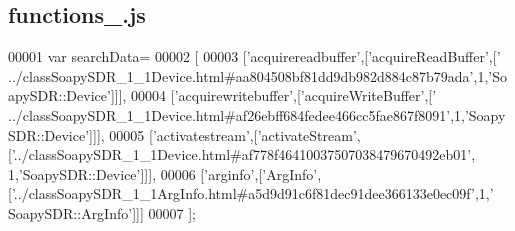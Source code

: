 \subsection{functions\+\_.\+js}
\label{functions__0_8js_source}

\begin{DoxyCode}
00001 var searchData=
00002 [
00003   [\textcolor{stringliteral}{'acquirereadbuffer'},[\textcolor{stringliteral}{'acquireReadBuffer'},[\textcolor{stringliteral}{'
      ../classSoapySDR\_1\_1Device.html#aa804508bf81dd9db982d884c87b79ada'},1,\textcolor{stringliteral}{'SoapySDR::Device'}]]],
00004   [\textcolor{stringliteral}{'acquirewritebuffer'},[\textcolor{stringliteral}{'acquireWriteBuffer'},[\textcolor{stringliteral}{'
      ../classSoapySDR\_1\_1Device.html#af26ebff684fedee466cc5fae867f8091'},1,\textcolor{stringliteral}{'SoapySDR::Device'}]]],
00005   [\textcolor{stringliteral}{'activatestream'},[\textcolor{stringliteral}{'activateStream'},[\textcolor{stringliteral}{'../classSoapySDR\_1\_1Device.html#af778f46410037507038479670492eb01'},
      1,\textcolor{stringliteral}{'SoapySDR::Device'}]]],
00006   [\textcolor{stringliteral}{'arginfo'},[\textcolor{stringliteral}{'ArgInfo'},[\textcolor{stringliteral}{'../classSoapySDR\_1\_1ArgInfo.html#a5d9d91c6f81dec91dee366133e0ec09f'},1,\textcolor{stringliteral}{'
      SoapySDR::ArgInfo'}]]]
00007 ];
\end{DoxyCode}
